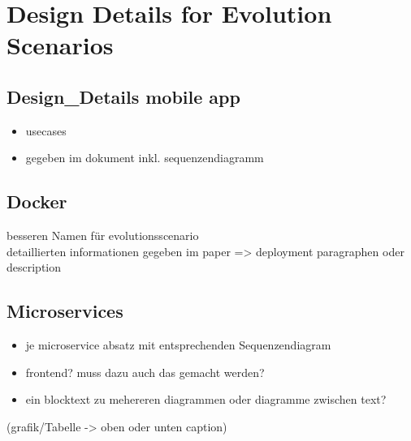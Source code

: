 \section{Design Details for Evolution Scenarios}
\subsection{Design\_Details mobile app}
	\begin{itemize}
		\item usecases
		\item gegeben im dokument inkl. sequenzendiagramm
	\end{itemize}
\subsection{Docker}
	besseren Namen für evolutionsscenario\\
	detaillierten informationen gegeben im paper
	=> deployment paragraphen oder description
\subsection{Microservices}
	\begin{itemize}
		\item je microservice absatz mit entsprechenden Sequenzendiagram %
		\item frontend? muss dazu auch das gemacht werden?
		\item ein blocktext zu mehereren diagrammen oder diagramme zwischen text?
	\end{itemize}
	
	
(grafik/Tabelle  -> oben oder unten caption)